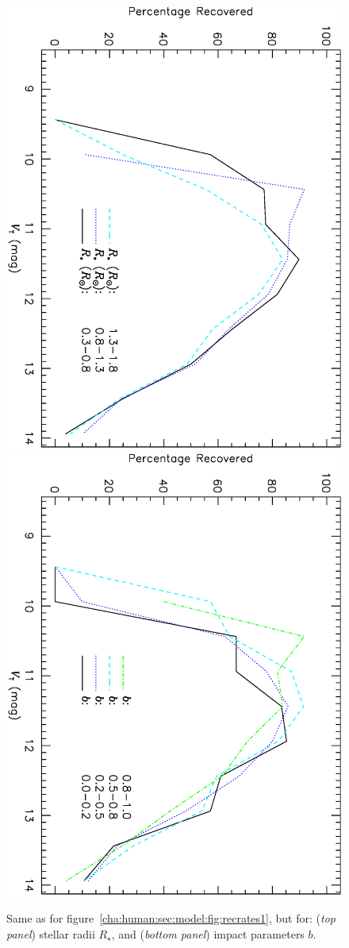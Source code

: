 \begin{figure}
\begin{center}
\centering
\includegraphics[width=.55\textwidth, angle=90]{7_comp_h}\\
\includegraphics[width=.55\textwidth, angle=90]{7_comp_i}\\
\caption[BLS recovery rates for different stellar radii and impact parameters]{%
Same as for figure~\ref{cha:human:sec:model:fig:recrates1}, but for: %
({\it top panel})  stellar radii $R_{\star}$, and %
({\it bottom panel})  impact parameters $b$. %
}
\label{cha:human:sec:model:fig:recrates2}
\end{center}
\end{figure}

